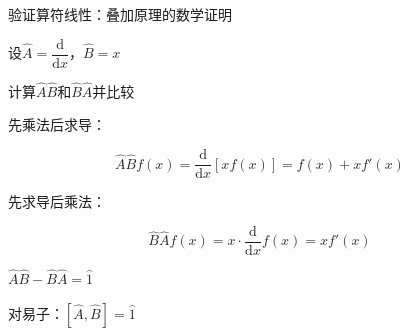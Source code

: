 \documentclass[aspectratio=169, 10pt]{beamer}
\begin{document}
\begin{frame}{验证算符线性：叠加原理的数学证明}
  
  \begin{iqbitemize}
    \item 设$\hat{A} = \dfrac{\mathrm{d}}{\mathrm{d}x}$，$\hat{B} = x$
    \item 计算$\hat{A}\hat{B}$和$\hat{B}\hat{A}$并比较
    \end{iqbitemize}
    \iqbsmallsep

    \begin{iqbitemize}
    \item 先乘法后求导：
    \end{iqbitemize}
      \[
        \hat{A}\hat{B}f(x) = \dfrac{\mathrm{d}}{\mathrm{d}x}[x f(x)] = f(x) + x f'(x)
      \]
    \begin{iqbitemize}
    \item 先求导后乘法：
    \end{iqbitemize}
      \[
        \hat{B}\hat{A}f(x) = x \cdot \dfrac{\mathrm{d}}{\mathrm{d}x}f(x) = x f'(x)
      \]
    \iqbsmallsep

    \begin{iqbitemize}
    \item $\hat{A}\hat{B} - \hat{B}\hat{A} = \hat{1}$
    \item 对易子：$[\hat{A}, \hat{B}] = \hat{1}$
    \end{iqbitemize}

\end{frame}
\end{document}
